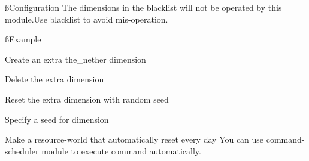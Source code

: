 \ss{Configuration}
The dimensions in the blacklist will not be operated by this module.Use blacklist to avoid mis-operation.

\ss{Example}
\begin{example}{Create an extra the\_nether dimension}
\end{example}

\begin{example}{Delete the extra dimension}
\end{example}

\begin{example}{Reset the extra dimension with random seed}
\end{example}

\begin{tips}{Specify a seed for dimension}
    \\
\end{tips}

\begin{tips}{Make a resource-world that automatically reset every day}
    You can use command-scheduler module to execute  command automatically.
\end{tips}